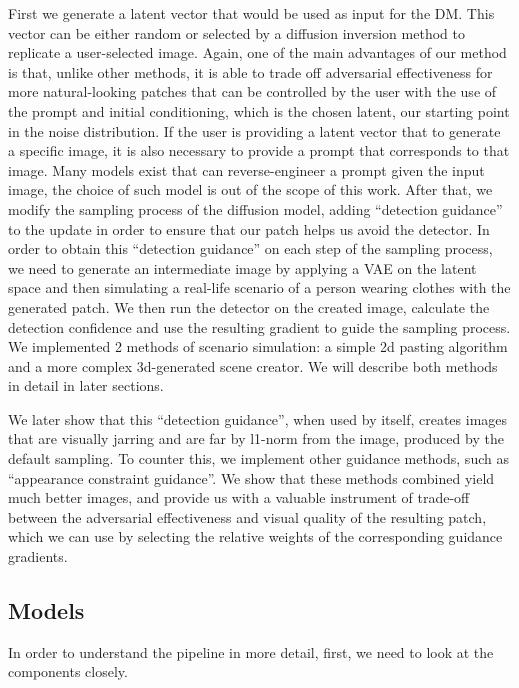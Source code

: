 First we generate a latent vector that would be used as input for the DM. This vector can be either random or selected by a diffusion inversion method to replicate a user-selected image.
Again, one of the main advantages of our method is that, unlike other methods, it is able to trade off adversarial effectiveness for more natural-looking patches that can be controlled by the user with the use of the prompt and initial conditioning, which is the chosen latent, our starting point in the noise distribution.
If the user is providing a latent vector that to generate a specific image, it is also necessary to provide a prompt that corresponds to that image. Many models exist that can reverse-engineer a prompt given the input image, the choice of such model is out of the scope of this work.
After that, we modify the sampling process of the diffusion model, adding ``detection guidance'' to the update in order to ensure that our patch helps us avoid the detector.
In order to obtain this ``detection guidance'' on each step of the sampling process, we need to generate an intermediate image by applying a VAE on the latent space and then simulating a real-life scenario of a person wearing clothes with the generated patch. We then run the detector on the created image, calculate the detection confidence and use the resulting gradient to guide the sampling process. We implemented 2 methods of scenario simulation: a simple 2d pasting algorithm and a more complex 3d-generated scene creator. We will describe both methods in detail in later sections.

We later show that this ``detection guidance'', when used by itself, creates images that are visually jarring and are far by l1-norm from the image, produced by the default sampling. To counter this, we implement other guidance methods, such as ``appearance constraint guidance''. We show that these methods combined yield much better images, and provide us with a valuable instrument of trade-off between the adversarial effectiveness and visual quality of the resulting patch, which we can use by selecting the relative weights of the corresponding guidance gradients.

\subsection{Models}

In order to understand the pipeline in more detail, first, we need to look at the components closely.

